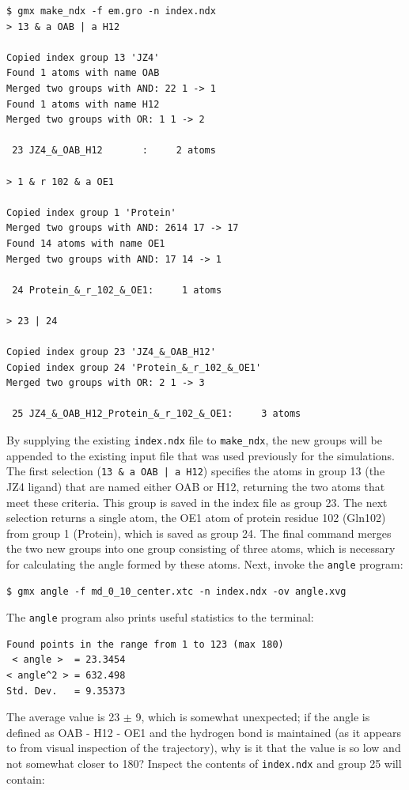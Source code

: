 \documentclass[9pt,tutorial,pubversion]{livecoms}
\begin{document}
\begin{lstlisting}[basicstyle=\footnotesize\ttfamily]
$ gmx make_ndx -f em.gro -n index.ndx 
> 13 & a OAB | a H12

Copied index group 13 'JZ4'
Found 1 atoms with name OAB
Merged two groups with AND: 22 1 -> 1
Found 1 atoms with name H12
Merged two groups with OR: 1 1 -> 2

 23 JZ4_&_OAB_H12       :     2 atoms

> 1 & r 102 & a OE1

Copied index group 1 'Protein'
Merged two groups with AND: 2614 17 -> 17
Found 14 atoms with name OE1
Merged two groups with AND: 17 14 -> 1

 24 Protein_&_r_102_&_OE1:     1 atoms

> 23 | 24

Copied index group 23 'JZ4_&_OAB_H12'
Copied index group 24 'Protein_&_r_102_&_OE1'
Merged two groups with OR: 2 1 -> 3

 25 JZ4_&_OAB_H12_Protein_&_r_102_&_OE1:     3 atoms
\end{lstlisting}

By supplying the existing \texttt{index.ndx} file to \texttt{make\_ndx}, the new groups will be appended to the existing input file that was used previously for the simulations. The first selection (\texttt{13 \& a OAB | a H12}) specifies the atoms in group 13 (the JZ4 ligand) that are named either OAB or H12, returning the two atoms that meet these criteria. This group is saved in the index file as group 23. The next selection returns a single atom, the OE1 atom of protein residue 102 (Gln102) from group 1 (Protein), which is saved as group 24. The final command merges the two new groups into one group consisting of three atoms, which is necessary for calculating the angle formed by these atoms. Next, invoke the \texttt{angle} program:

\begin{lstlisting}
$ gmx angle -f md_0_10_center.xtc -n index.ndx -ov angle.xvg  
\end{lstlisting}

The \texttt{angle} program also prints useful statistics to the terminal:

\begin{lstlisting}
Found points in the range from 1 to 123 (max 180)
 < angle >  = 23.3454
< angle^2 > = 632.498
Std. Dev.   = 9.35373
\end{lstlisting}

The average value is 23 $\pm$ 9\textdegree, which is somewhat unexpected; if the angle is defined as OAB - H12 - OE1 and the hydrogen bond is maintained (as it appears to from visual inspection of the trajectory), why is it that the value is so low and not somewhat closer to 180\textdegree? Inspect the contents of \texttt{index.ndx} and group 25 will contain:
\end{document}

